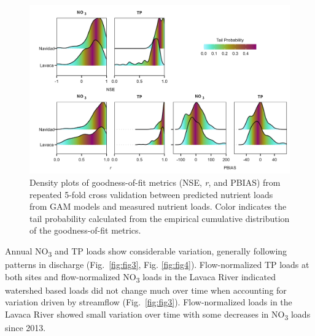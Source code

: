 \documentclass[fleqn,10pt,lineno]{wlpeerj} %
\begin{document}
\begin{figure}

{\centering \includegraphics[width=1\linewidth,]{Schramm-2023-06-PeerJ_files/figure-latex/fig2-1} 

}

\caption{Density plots of goodness-of-fit metrics (NSE, \textit{r}, and PBIAS) from repeated 5-fold cross validation between predicted nutrient loads from GAM models and measured nutrient loads. Color indicates the tail probability calculated from the empirical cumulative distribution of the goodness-of-fit metrics.}\label{fig:fig2}
\end{figure}

Annual NO\textsubscript{3} and TP loads show considerable variation,
generally following patterns in discharge (Fig.~\ref{fig:fig3}, Fig.
\ref{fig:fig4}). Flow-normalized TP loads at both sites and
flow-normalized NO\textsubscript{3} loads in the Lavaca River indicated
watershed based loads did not change much over time when accounting for
variation driven by streamflow (Fig.~\ref{fig:fig3}). Flow-normalized
loads in the Lavaca River showed small variation over time with some
decreases in NO\textsubscript{3} loads since 2013.
\end{document}
